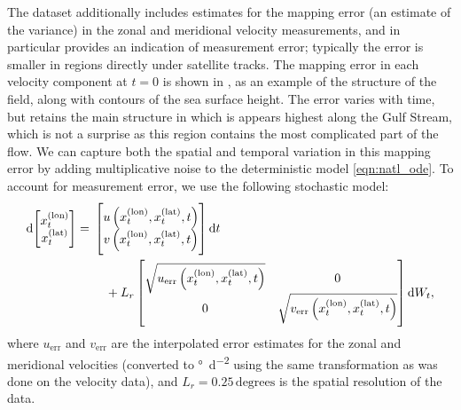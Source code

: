 The dataset additionally includes estimates for the mapping error (an estimate of the variance) in the zonal and meridional velocity measurements, and in particular provides an indication of measurement error; typically the error is smaller in regions directly under satellite tracks.
The mapping error in each velocity component at \(t = 0\) is shown in , as an example of the structure of the field, along with contours of the sea surface height.
The error varies with time, but retains the main structure in which is appears highest along the Gulf Stream, which is not a surprise as this region contains the most complicated part of the flow.
We can capture both the spatial and temporal variation in this mapping error by adding multiplicative noise to the deterministic model \cref{eqn:natl_ode}.
To account for measurement error, we use the following stochastic model:
\begin{equation}
	\dif \begin{bmatrix}
		x^{(\mathrm{lon})}_t \\ x^{(\mathrm{lat})}_t
	\end{bmatrix} = \begin{multlined}[t]
		\begin{bmatrix} u\left(x^{(\mathrm{lon})}_t, x^{(\mathrm{lat})}_t, t\right) \\ v\left(x^{(\mathrm{lon})}_t, x^{(\mathrm{lat})}_t, t\right) \end{bmatrix}\dif t \\
		+ L_r\begin{bmatrix}
			\sqrt{u_{\mathrm{err}}\left(x^{(\mathrm{lon})}_t, x^{(\mathrm{lat})}_t, t\right)} & 0                                                                                 \\
			0                                                                                 & \sqrt{v_{\mathrm{err}}\left(x^{(\mathrm{lon})}_t, x^{(\mathrm{lat})}_t, t\right)}
		\end{bmatrix} \dif W_t,
	\end{multlined}
	\label{eqn:natl_sde}
\end{equation}
where \(u_{\mathrm{err}}\) and \(v_{\mathrm{err}}\) are the interpolated error estimates for the zonal and meridional velocities (converted to \unit{\degree\per\square\day} using the same transformation as was done on the velocity data), and \(L_r = 0.25 \mathrm{\,degrees}\) is the spatial resolution of the data.






